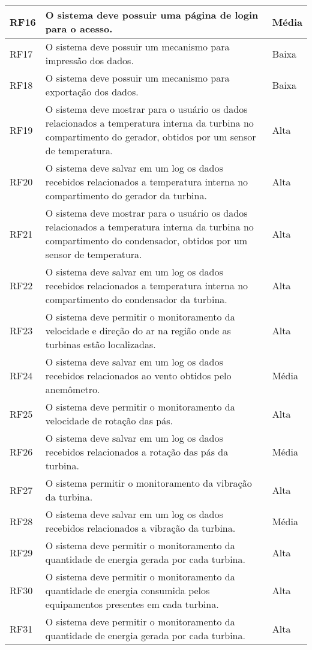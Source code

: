 \documentclass[12pt,openright,oneside,a4paper,brazil]{abntex2}
\begin{document}
\begin{longtable}{|p{4cm}|p{9cm}|p{2cm}|}
RF16& 	O sistema deve possuir uma página de login para o acesso.		& Média	\\ \hline
RF17& 	O sistema deve possuir um mecanismo para impressão dos dados.	& Baixa\\ \hline
RF18& 	O sistema deve possuir um mecanismo para exportação dos dados.& 	Baixa		\\ \hline	
RF19& 	O sistema deve mostrar para o usuário os dados relacionados a temperatura interna da turbina no compartimento do gerador, obtidos por um sensor de temperatura.& 	Alta\\ \hline
RF20& 	O sistema deve salvar em um log os dados recebidos relacionados a temperatura interna no compartimento do gerador da turbina.	& Alta\\ \hline
RF21& 	O sistema deve mostrar para o usuário os dados relacionados a temperatura interna da turbina no compartimento do condensador, obtidos por um sensor de temperatura.	& Alta\\ \hline
RF22& 	O sistema deve salvar em um log os dados recebidos relacionados a temperatura interna no compartimento do condensador da turbina.	& Alta\\ \hline
RF23& 	O sistema deve permitir o monitoramento da velocidade e direção do ar na região onde as turbinas estão localizadas.& 	Alta\\ \hline
RF24& 	O sistema deve salvar em um log os dados recebidos relacionados ao vento obtidos pelo anemômetro.	& Média\\ \hline
RF25& 	O sistema deve permitir o monitoramento da velocidade de rotação das pás.& 	Alta\\ \hline
RF26& 	O sistema deve salvar em um log os dados recebidos relacionados a rotação das pás da turbina.	& Média\\ \hline
RF27& 	O sistema permitir o monitoramento da vibração da turbina.	& Alta\\ \hline
RF28& 	O sistema deve salvar em um log os dados recebidos relacionados a vibração da turbina.& 	Média\\ \hline
RF29& 	O sistema deve permitir o monitoramento da quantidade de energia gerada por cada turbina.	& Alta\\ \hline
RF30& 	O sistema deve permitir o monitoramento da quantidade de energia consumida pelos equipamentos presentes em cada turbina.	& Alta\\ \hline
RF31& 	O sistema deve permitir o monitoramento da quantidade de energia gerada por cada turbina.	& Alta\\ \hline

\end{longtable}
\end{document}
